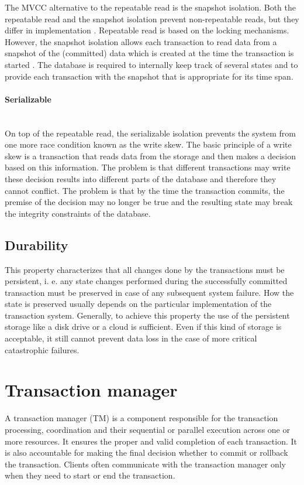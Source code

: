 \documentclass[oneside,
  digital, %
  table,   %
  lof,     %
  lot,     %
]{fithesis3}
\newcommand{\newlinepar}[1]{\paragraph{#1}\needspace{4\baselineskip}\mbox{}\\}
\begin{document}
The MVCC alternative to the repeatable read is the snapshot isolation. Both the repeatable read and the snapshot isolation prevent non-repeatable reads, but they differ in implementation \cite{isolation_levels}. Repeatable read is based on the locking mechanisms. However, the snapshot isolation allows each transaction to read data from a snapshot of the (committed) data which is created at the time the transaction is started \cite{ansi-sql-critique}. The database is required to internally keep track of several states and to provide each transaction with the snapshot that is appropriate for its time span.

\newlinepar{Serializable}

On top of the repeatable read, the serializable isolation prevents the system from one more race condition known as the write skew. The basic principle of a write skew is a transaction that reads data from the storage and then makes a decision based on this information. The problem is that different transactions may write these decision results into different parts of the database and therefore they cannot conflict. The problem is that by the time the transaction commits, the premise of the decision may no longer be true and the resulting state may break the integrity constraints of the database.

\subsection{Durability}

This property characterizes that all changes done by the transactions must be persistent, i. e. any state changes performed during the successfully committed transaction must be preserved in case of any subsequent system failure. How the state is preserved usually depends on the particular implementation of the transaction system. Generally, to achieve this property the use of the persistent storage like a disk drive or a cloud is sufficient. Even if this kind of storage is acceptable, it still cannot prevent data loss in the case of more critical catastrophic failures.


\section{Transaction manager}
\label{sec:transaction-manager}

A transaction manager (TM) is a component responsible for the transaction processing, coordination and their sequential or parallel execution across one or more resources. It ensures the proper and valid completion of each transaction. It is also accountable for making the final decision whether to commit or rollback the transaction. Clients often communicate with the transaction manager only when they need to start or end the transaction.
\end{document}
